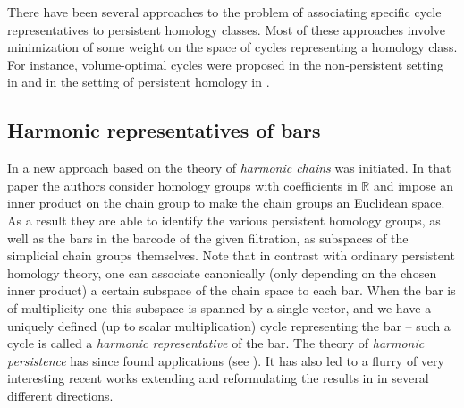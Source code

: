 \documentclass[11pt]{amsart}
\theoremstyle{theorem}
\theoremstyle{remark}
\theoremstyle{definition}
\newcommand{\R}{\mathbb{R}}
\begin{document}
There have been several approaches to the problem of
associating specific cycle representatives to persistent homology classes.
Most of these approaches involve minimization of some weight on the space of cycles representing a homology class.
For instance,
volume-optimal cycles were proposed in the non-persistent setting in \cite{Dey-2010} and in the setting of persistent homology in \cite{volume}. %


\subsection{Harmonic representatives of bars}
In \cite{Basu-Cox} a new
approach based on the theory of \emph{harmonic chains} was initiated. 
In that paper the authors consider homology groups with coefficients in $\R$ and impose an inner product on the chain
group to make the chain groups an Euclidean space.
As a result they are able to identify the various persistent 
homology groups, as well as the bars in the barcode of the given filtration, as subspaces of the  
simplicial chain groups themselves. 
Note that in contrast with ordinary persistent homology theory, one can associate canonically (only depending on the chosen inner product) a certain subspace
of the chain space to each bar. When the bar is of multiplicity one
this subspace is spanned by a single vector, and we have a uniquely defined (up to scalar multiplication)
cycle representing the bar --  such a cycle is called a \emph{harmonic representative} of the bar. 
The theory of \emph{harmonic persistence} has since found applications (see \cite{Gurnari-et-al}).
It has also led to a flurry of very interesting recent works \cite{hou2024,gulen2025grassmannianpersistencediagramsspecial} extending and reformulating the results in \cite{Basu-Cox} in several different directions.
\end{document}
